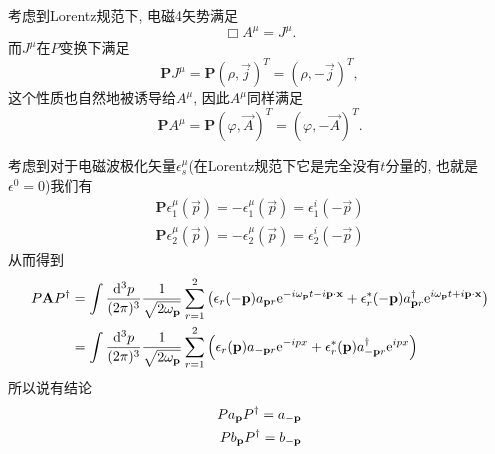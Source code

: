 \begin{example}[电磁场的宇称变换]
    考虑到Lorentz规范下, 电磁4矢势满足
    \begin{equation}
        \Box A^\mu=J^\mu.
    \end{equation}
    而$J^\mu$在$P$变换下满足
    \begin{equation}
        \boldsymbol{\mathbf P}J^\mu=\boldsymbol{\mathbf P}(\rho, \vec j)^T=(\rho, -\vec j)^T,
    \end{equation}
    这个性质也自然地被诱导给$A^\mu$, 因此$A^\mu$同样满足
    \begin{equation}
        \boldsymbol{\mathbf P}A^\mu=\boldsymbol{\mathbf P}(\varphi, \vec A)^T=(\varphi, -\vec A)^T.
    \end{equation}
    
    考虑到对于电磁波极化矢量$\epsilon_s^\mu$(在Lorentz规范下它是完全没有$t$分量的, 也就是$\epsilon^0=0$)我们有
    \begin{align}
        \boldsymbol{\mathbf P}\epsilon_1^\mu(\vec p)=-\epsilon_1^\mu(\vec p)=\epsilon_1^i(-\vec p)\\
        \boldsymbol{\mathbf P}\epsilon_2^\mu(\vec p)=-\epsilon_2^\mu(\vec p)=\epsilon_2^i(-\vec p)
    \end{align}
    从而得到
    \begin{align}
        P\vec A P^\dagger&=\int\ldsq p\sum_{r=1}^2\left(\vec\epsilon_r(-\vec p)a_{\vec pr}\exp{-i\om pt-i\vec p\cdot\vec x}+\vec\epsilon_r^*(-\vec p)a_{\vec pr}^\dagger\exp{i\om pt+i\vec p\cdot\vec x}\right)\\
        &=\int\ldsq p\sum_{r=1}^2\left(\vec\epsilon_r(\vec p)a_{-\vec pr}\exp{-ipx}+\vec\epsilon_r^*(\vec p)a_{-\vec pr}^\dagger\exp{ipx}\right)
    \end{align}
    所以说有结论
    \begin{align}
        Pa_{\mathbf{p}} P^\dagger=a_{\mathbf{-p}}\\
        Pb_{\mathbf{p}} P^\dagger=b_{\mathbf{-p}}
    \end{align}
\end{example}
